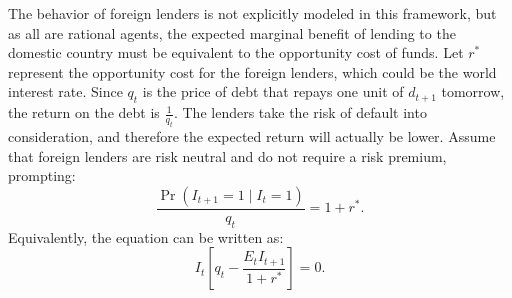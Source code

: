 The behavior of foreign lenders is not explicitly modeled in this framework, but as all are rational agents, the expected marginal benefit of lending to the domestic country must be equivalent to the opportunity cost of funds.
Let $r^*$ represent the opportunity cost for the foreign lenders, which could be the world interest rate. Since $q_t$ is the price of debt that repays one unit of $d_{t+1}$ tomorrow, the return on the debt is $\frac{1}{q_t}$. The lenders take the risk of default into consideration, and therefore the expected return will actually be lower. Assume that foreign lenders are risk neutral and do not require a risk premium, prompting:
\begin{equation}
    \label{eq:lender}
    \frac{\Pr(I_{t+1}=1 \mid I_{t}=1)}{q_t} = 1 + r^* .
\end{equation}
Equivalently, the equation can be written as:
\begin{equation*}
    I_t \left[ q_t - \frac{E_t I_{t+1}}{1+r^*} \right] = 0.
\end{equation*}
